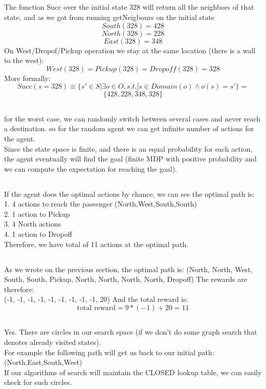 \documentclass[12pt]{article}
\begin{document}
\subsection{}
The function Succ over the initial state 328 will return all the neighbors of that state, and as we got from running getNeigbours on the initial state\\
$$South(328)=428$$
$$North(328)=228$$
$$East(328)=348$$
On West/Dropof/Pickup operation we stay at the same location (there is a wall to the west):
$$West(328)=Pickup(328)=Dropoff(328)=328$$
More formally:
$$Succ(s=328)\equiv\{s'\in S | \exists o\in O, s.t. [s \in Domain(o)\wedge o(s)=s'\} = $$
$$\{428,228,348,328\}$$
\subsection{}
for the worst case, we can randomly switch between several cases and never reach a destination. so for the random agent we can get infinite number of actions for the agent.\\
Since the state space is finite, and there is an equal probability for each action, the agent eventually will find the goal (finite MDP with positive probability and we can compute the expectation for reaching the goal).
\subsection{}
If the agent does the optimal actions by chance, we can see the optimal path is:\\
1. 4 actions to reach the passenger (North,West,South,South)\\
2. 1 action to Pickup\\
3. 4 North actions\\
4. 1 action to Dropoff\\
Therefore, we have total of 11 actions at the optimal path.
\subsection{}
As we wrote on the previous section, the optimal path is:
(North, North, West, South, South, Pickup, North, North, North, North, Dropoff)
The rewards are therefore:\\
(-1, -1, -1, -1, -1, -1, -1, -1, -1, 20)
And the total reward is:
$$\text{total reward} = 9*(-1) + 20 = 11$$

\subsection{}
Yes. There are circles in our search space (if we don't do some graph search that denotes already visited states).\\
For example the following path will get us back to our initial path:\\
(North,East,South,West)\\
If our algorithms of search will maintain the CLOSED lookup table, we can easily check for such circles.
\end{document}
